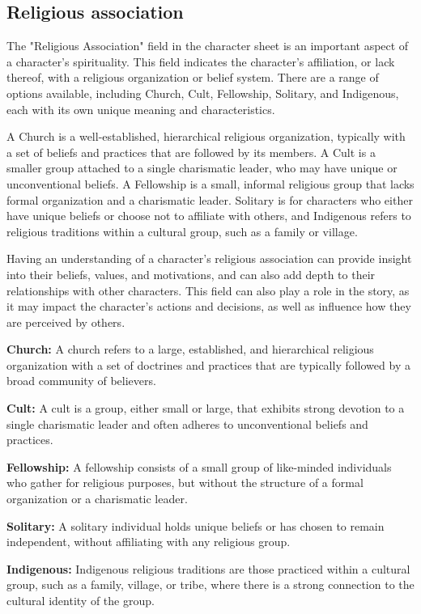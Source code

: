 \documentclass[12pt]{book}
\begin{document}
\subsection{\textbf{Religious association}}

The "Religious Association" field in the character sheet is an important aspect of a character's spirituality. This field indicates the character's affiliation, or lack thereof, with a religious organization or belief system. There are a range of options available, including Church, Cult, Fellowship, Solitary, and Indigenous, each with its own unique meaning and characteristics.

A Church is a well-established, hierarchical religious organization, typically with a set of beliefs and practices that are followed by its members. A Cult is a smaller group attached to a single charismatic leader, who may have unique or unconventional beliefs. A Fellowship is a small, informal religious group that lacks formal organization and a charismatic leader. Solitary is for characters who either have unique beliefs or choose not to affiliate with others, and Indigenous refers to religious traditions within a cultural group, such as a family or village.

Having an understanding of a character's religious association can provide insight into their beliefs, values, and motivations, and can also add depth to their relationships with other characters. This field can also play a role in the story, as it may impact the character's actions and decisions, as well as influence how they are perceived by others.

\textbf{Church:} A church refers to a large, established, and hierarchical religious organization with a set of doctrines and practices that are typically followed by a broad community of believers.

\textbf{Cult:} A cult is a group, either small or large, that exhibits strong devotion to a single charismatic leader and often adheres to unconventional beliefs and practices.

\textbf{Fellowship:} A fellowship consists of a small group of like-minded individuals who gather for religious purposes, but without the structure of a formal organization or a charismatic leader.

\textbf{Solitary:} A solitary individual holds unique beliefs or has chosen to remain independent, without affiliating with any religious group.

\textbf{Indigenous:} Indigenous religious traditions are those practiced within a cultural group, such as a family, village, or tribe, where there is a strong connection to the cultural identity of the group.
\end{document}
